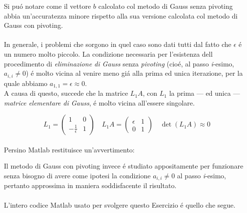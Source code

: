 \noindent Si pu\'o notare come il vettore \(b\) calcolato col metodo di Gauss senza pivoting abbia un'accuratezza minore rispetto alla sua versione calcolata col metodo di Gauss con pivoting.
\\
\\In generale, i problemi che sorgono in quel caso sono dati tutti dal fatto che \(\epsilon \) \'e un numero molto piccolo. La condizione necessaria per l'esistenza dell procedimento di \textit{eliminazione di Gauss} senza \textit{pivoting} (cio\'e, al passo \textit{i}-esimo, \(a_{i,i} \neq 0\)) \'e molto vicina al venire meno gi\'a alla prima ed unica iterazione, per la quale abbiamo \(a_{1,1} = \epsilon \approx 0\).
\\

\noindent A causa di questo, succede che la matrice \(L_1A\), con \(L_1\) la prima --- ed unica --- \textit{matrice elementare di Gauss}, \'e molto vicina all'essere singolare.

\[
L_1 = \begin{pmatrix} 1 & 0 \\ -\frac{1}{\epsilon} & 1 \end{pmatrix} \quad L_1A = \begin{pmatrix} \epsilon & 1 \\ 0 & 1\end{pmatrix} \quad \det(L_1A) \approx 0
\]
\\
Persino Matlab restituisce un'avvertimento:


\noindent Il metodo di Gauss con pivoting invece \'e studiato appositamente per funzionare senza bisogno di avere come ipotesi la condizione \(a_{i,i} \neq 0\) al passo \textit{i}-esimo, pertanto approssima in maniera soddisfacente il risultato.
\\
\\
\noindent L'intero codice Matlab usato per svolgere questo Esercizio \'e quello che segue.
\\


